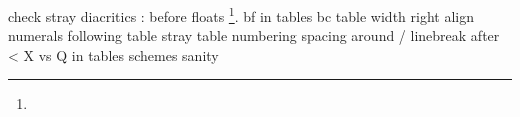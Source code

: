 check stray diacritics 
: before floats
\footnote{}. 
bf in tables
bc table width 
right align numerals
following table
stray table numbering
spacing around /
linebreak after <
X vs Q in tables
schemes
sanity